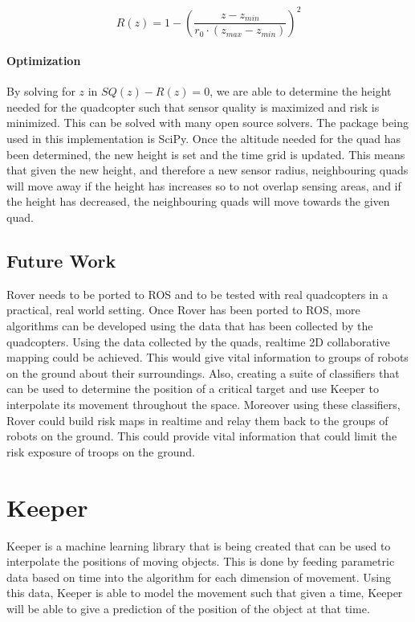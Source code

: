 \documentclass[12pt]{article}
\begin{document}
$$ R(z) = 1 - (\frac{z - z_{min}}{r_0 \cdot (z_{max} - z_{min})}) ^ 2 $$

\paragraph{Optimization}

By solving for $z$ in $SQ(z) - R(z) = 0$, we are able to determine the height
needed for the quadcopter such that sensor quality is maximized and risk is
minimized. This can be solved with many open source solvers. The package being
used in this implementation is SciPy. Once the altitude needed for the quad has
been determined, the new height is set and the time grid is updated. This means
that given the new height, and therefore a new sensor radius, neighbouring
quads will move away if the height has increases so to not overlap sensing
areas, and if the height has decreased, the neighbouring quads will move
towards the given quad.

\subsection{Future Work}

Rover needs to be ported to ROS and to be tested with real quadcopters in a
practical, real world setting. Once Rover has been ported to ROS, more
algorithms can be developed using the data that has been collected by the
quadcopters. Using the data collected by the quads, realtime 2D collaborative
mapping could be achieved. This would give vital information to groups of
robots on the ground about their surroundings. Also, creating a suite of
classifiers that can be used to determine the position of a critical target and
use Keeper to interpolate its movement throughout the space. Moreover using
these classifiers, Rover could build risk maps in realtime and relay them back
to the groups of robots on the ground.  This could provide vital information
that could limit the risk exposure of troops on the ground.

\section{Keeper}

Keeper is a machine learning library that is being created that can be used to
interpolate the positions of moving objects. This is done by feeding parametric
data based on time into the algorithm for each dimension of movement. Using
this data, Keeper is able to model the movement such that given a time, Keeper
will be able to give a prediction of the position of the object at that time.
\end{document}
